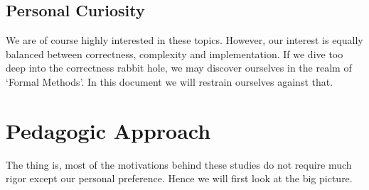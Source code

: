 \documentclass[../../main.tex]{subfiles}
\begin{document}
\subsection{Personal Curiosity}
We are of course highly interested in these topics. However, our
interest is equally balanced between correctness, complexity and
implementation. If we dive too deep into the correctness rabbit hole,
we may discover ourselves in the realm of `Formal Methods'. In this
document we will restrain ourselves against that.


\section{Pedagogic Approach}
The thing is, most of the motivations behind these studies do not
require much rigor except our personal preference. Hence we will first
look at the big picture.
\end{document}
